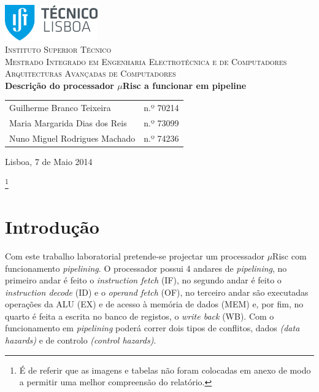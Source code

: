 \documentclass[11pt]{article}
\numberwithin{equation}{section}
\begin{document}
\begin{titlepage}
\begin{center}

\hfill \break
\hfill \break

\includegraphics[width=0.3\textwidth]{./logo}~\\[1cm]

\textsc{\LARGE Instituto Superior Técnico}\\[0.25cm]
\textsc{\Large Mestrado Integrado em Engenharia Electrotécnica e de Computadores}\\[1.8cm]
\textsc{\huge Arquitecturas Avançadas de Computadores}\\[0.25cm]

{\huge \bfseries Descrição do processador $\mu$Risc a funcionar em pipeline\\[1.2cm]}

\begin{tabular}{ l l }
Guilherme Branco Teixeira & \hspace{2mm} n.º 70214 \\ 
Maria Margarida Dias dos Reis & \hspace{2mm} n.º 73099 \\
Nuno Miguel Rodrigues Machado & \hspace{2mm} n.º 74236 
\end{tabular}

\vfill

{\large Lisboa, 7 de Maio 2014} 

\end{center}
\end{titlepage}
 
\clearpage

\footnote{É de referir que as imagens e tabelas não foram colocadas em anexo de modo a permitir uma melhor compreensão do relatório.}

\tableofcontents
\pagebreak

\clearpage
{}

\section{Introdução}

Com este trabalho laboratorial pretende-se projectar um processador $\mu$Risc com funcionamento \textit{pipelining}. O processador possui 4 andares de \textit{pipelining}, no primeiro andar é feito o \textit{instruction fetch} (IF), no segundo andar é feito o \textit{instruction decode} (ID) e o \textit{operand fetch} (OF), no terceiro andar são executadas operações da ALU (EX) e de acesso à memória de dados (MEM) e, por fim, no quarto é feita a escrita no banco de registos, o \textit{write back }(WB). Com o funcionamento em \textit{pipelining} poderá correr dois tipos de conflitos, dados \textit{(data hazards)} e de controlo \textit{(control hazards)}. 
 
\end{document}
